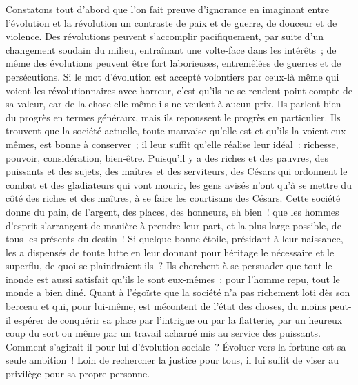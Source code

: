 \documentclass[french,twoside]{book} %
\begin{document}
 Constatons tout d’abord que l’on fait preuve d’ignorance en imaginant entre l’évolution et la révolution un contraste de paix et de guerre, de douceur et de violence. Des révolutions peuvent s’accomplir pacifiquement, par suite d’un changement soudain du milieu, entraînant une volte-face dans les intérêts ; de même des évolutions peuvent être fort laborieuses, entremêlées de guerres et de persécutions. Si le mot d’évolution est accepté volontiers par ceux-là même qui voient les révolutionnaires avec horreur, c’est qu’ils ne se rendent point compte de sa valeur, car de la chose elle-même ils ne veulent à aucun prix. Ils parlent bien du progrès en termes généraux, mais ils repoussent le progrès en particulier. Ils trouvent que la  société actuelle, toute mauvaise qu’elle est et qu’ils la voient eux-mêmes, est bonne à conserver ; il leur suffit qu’elle réalise leur idéal : richesse, pouvoir, considération, bien-être. Puisqu’il y a des riches et des pauvres, des puissants et des sujets, des maîtres et des serviteurs, des Césars qui ordonnent le combat et des gladiateurs qui vont mourir, les gens avisés n’ont qu’à se mettre du côté des riches et des maîtres, à se faire les courtisans des Césars. Cette société donne du pain, de l’argent, des places, des honneurs, eh bien ! que les hommes d’esprit s’arrangent de manière à prendre leur part, et la plus large possible, de tous les présents du destin ! Si quelque bonne étoile, présidant à leur naissance, les a dispensés de  toute lutte en leur donnant pour héritage le nécessaire et le superflu, de quoi se plaindraient-ils ? Ils cherchent à se persuader que tout le inonde est aussi satisfait qu’ils le sont eux-mêmes : pour l’homme repu, tout le monde a bien diné. Quant à l’égoïste que la société n’a pas richement loti dès son berceau et qui, pour lui-même, est mécontent de l’état des choses, du moins peut-il espérer de conquérir sa place par l’intrigue ou par la flatterie, par un heureux coup du sort ou même par un travail acharné mis au service des puissants. Comment s’agirait-il pour lui d’évolution sociale ? Évoluer vers la fortune est sa seule ambition ! Loin de rechercher la justice pour tous, il lui suffit de viser au privilège pour sa propre personne.\par
\end{document}
